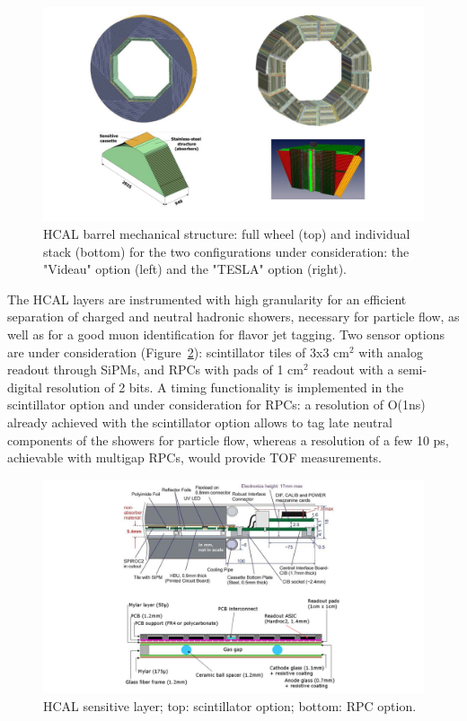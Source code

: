 \begin{figure}[t!]
\centering
\includegraphics[width=1.1\hsize]{Detector/fig/HCAL_structure.jpg}
\caption{HCAL barrel mechanical structure: full wheel (top) and individual stack (bottom) for the two configurations under consideration: the "Videau" option (left) and the "TESLA" option (right).}
\label{fig:det:HCAL}
\end{figure}

The HCAL layers are instrumented with high granularity for an efficient separation of charged and neutral hadronic showers, necessary for particle flow, as well as for a good muon identification for flavor jet tagging. Two sensor options are under consideration (Figure~\ref{fig:det:HCAL_readout}): scintillator tiles of 3x3 cm$^2$ with analog readout through SiPMs, and RPCs with pads of 1 cm$^2$ readout with a semi-digital resolution of 2 bits. A timing functionality is implemented in the scintillator option and under consideration for RPCs: a resolution of O(1ns) already achieved with the scintillator option allows to tag late neutral components of the showers for particle flow, whereas a resolution of a few 10 ps, achievable with multigap RPCs, would provide TOF measurements. 
\begin{figure}[t!]
\centering
\includegraphics[width=1.0\hsize]{Detector/fig/HCAL_readout.jpg}
\caption{HCAL sensitive layer; top: scintillator option; bottom: RPC option.}
\label{fig:det:HCAL_readout}
\end{figure}

